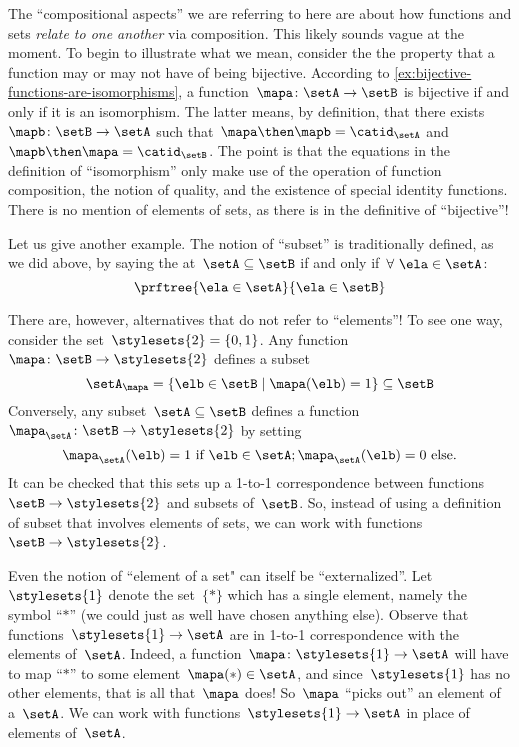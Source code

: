 The ``compositional aspects'' we are referring to here are about how functions and sets \emph{relate to one another} via composition.
This likely sounds vague at the moment.
To begin to illustrate what we mean, consider the the property that a function may or may not have of being bijective.
According to \cref{ex:bijective-functions-are-isomorphisms}, a function~$\mapa\colon \setA \to \setB$ is bijective if and only if it is an isomorphism.
The latter means, by definition, that there exists~$\mapb \colon \setB \to \setA$ such that~$\mapa \then \mapb = \catid_\setA$ and~$\mapb \then \mapa = \catid_\setB$.
The point is that the equations in the definition of ``isomorphism'' only make use of the operation of function composition, the notion of quality, and the existence of special identity functions.
There is no mention of elements of sets, as there is in the definitive of ``bijective''!

Let us give another example.
The notion of ``subset'' is traditionally defined, as we did above, by saying the at~$\setA \subseteq \setB$ if and only if~$\forall \ \ela \in \setA$:
\begin{equation*}
    \prftree{\ela \in \setA }{\ela \in \setB}
\end{equation*}

There are, however, alternatives that do not refer to ``elements''!
To see one way, consider the set~$\stylesets{2} = \{ 0, 1\}$.
Any function~$\mapa \colon \setB \to \stylesets{2}$ defines a subset
\begin{equation*}
    \setA_\mapa = \{ \elb \in \setB \mid \mapa(\elb) = 1 \} \subseteq \setB
\end{equation*}
Conversely, any subset~$\setA \subseteq \setB$ defines a function~$\mapa_\setA \colon \setB \to \stylesets{2}$ by setting
\begin{equation*}
    \mapa_\setA(\elb) = 1 \text{ if } \elb \in \setA; \mapa_\setA(\elb) = 0 \text{ else}.
\end{equation*}
It can be checked that this sets up a 1-to-1 correspondence between functions~$\setB \to \stylesets{2}$ and subsets of~$\setB$.
So, instead of using a definition of subset that involves elements of sets, we can work with functions~$\setB \to \stylesets{2}$.

Even the notion of ``element of a set" can itself be ``externalized''.
Let~$\stylesets{1}$ denote the set~$\{ * \}$ which has a single element, namely the symbol ``$*$'' (we could just as well have chosen anything else).
Observe that functions~$\stylesets{1} \to \setA$ are in 1-to-1 correspondence with the elements of~$\setA$.
Indeed, a function~$\mapa\colon \stylesets{1} \to \setA$ will have to map ``$*$'' to some element~$\mapa(*) \in \setA$, and since~$\stylesets{1}$ has no other elements, that is all that~$\mapa$ does!
So~$\mapa$ ``picks out'' an element of a~$\setA$.
We can work with functions~$\stylesets{1} \to \setA$ in place of elements of~$\setA$.

